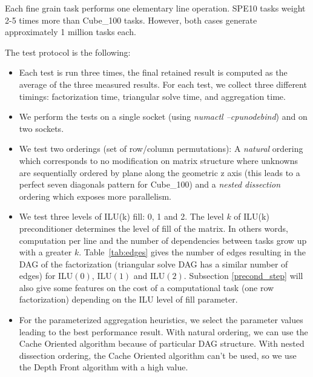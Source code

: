 Each fine grain task performs one elementary line operation. SPE10
tasks weight 2-5 times more than Cube\_100 tasks. However, both
cases generate approximately 1 million tasks each.

The test protocol is the following:
\begin{itemize}
\item Each test is run three times, the final retained result is
  computed as the average of the three measured results. For each
  test, we collect three different timings:
  factorization time, triangular solve time, and aggregation time.

\item We perform the tests on a single socket (using
      {\em numactl --cpunodebind}) and on two sockets.


\item We test two orderings (set of row/column permutations): A {\em natural} ordering which corresponds to no
      modification on matrix structure where unknowns are sequentially
      ordered by plane along the geometric z axis
      (this leads to a perfect seven diagonals pattern for Cube\_100)
      and a {\em nested dissection}~\cite{Saad96IMSLS} ordering which exposes more parallelism.


\item We test three levels of ILU(k) fill: 0, 1 and 2.
      The level $k$ of ILU(k) preconditioner determines the level of fill of
      the matrix. In others words, computation per line and the number of dependencies
      between tasks grow up with a greater $k$. Table~\ref{tab:edges} gives the number of edges resulting in the DAG of the factorization
      (triangular solve DAG has a similar number of edges) for ILU$(0)$, ILU$(1)$ and ILU$(2)$. Subsection \ref{precond_step} will also give some features on the cost of a computational task (one row factorization)
      depending on the ILU level of fill parameter.

\item For the parameterized aggregation heuristics, we select the
      parameter values leading to the best performance result. With
      natural ordering, we can use the Cache Oriented algorithm because of
      particular DAG structure. With nested dissection ordering, the Cache Oriented algorithm
      can't be used, so we use the Depth Front algorithm with a high value.
\end{itemize}



